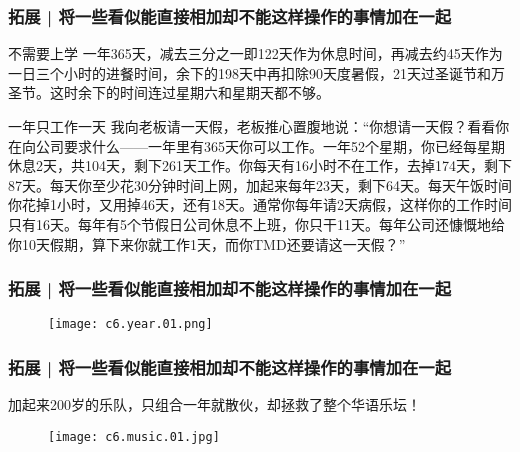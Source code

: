 \begin{frame}
  \frametitle{拓展 | 将一些看似能直接相加却不能这样操作的事情加在一起}
  \begin{block}{不需要上学}
一年365天，减去三分之一即122天作为休息时间，再减去约45天作为一日三个小时的进餐时间，余下的198天中再扣除90天度暑假，21天过圣诞节和万圣节。这时余下的时间连过星期六和星期天都不够。
  \end{block}
  \pause
  \begin{block}{一年只工作一天}
    我向老板请一天假，老板推心置腹地说：“你想请一天假？看看你在向公司要求什么——一年里有365天你可以工作。一年52个星期，你已经每星期休息2天，共104天，剩下261天工作。你每天有16小时不在工作，去掉174天，剩下87天。每天你至少花30分钟时间上网，加起来每年23天，剩下64天。每天午饭时间你花掉1小时，又用掉46天，还有18天。通常你每年请2天病假，这样你的工作时间只有16天。每年有5个节假日公司休息不上班，你只干11天。每年公司还慷慨地给你10天假期，算下来你就工作1天，而你TMD还要请这一天假？”
  \end{block}
\end{frame}

\begin{frame}
  \frametitle{拓展 | 将一些看似能直接相加却不能这样操作的事情加在一起}
  \begin{figure}
    \centering
    \texttt{[image: c6.year.01.png]}
  \end{figure}
\end{frame}

\begin{frame}
  \frametitle{拓展 | 将一些看似能直接相加却不能这样操作的事情加在一起}
  加起来200岁的乐队，只组合一年就散伙，却拯救了整个华语乐坛！
  \vspace{-0.5em}
  \begin{figure}
    \centering
    \texttt{[image: c6.music.01.jpg]}
  \end{figure}
\end{frame}

